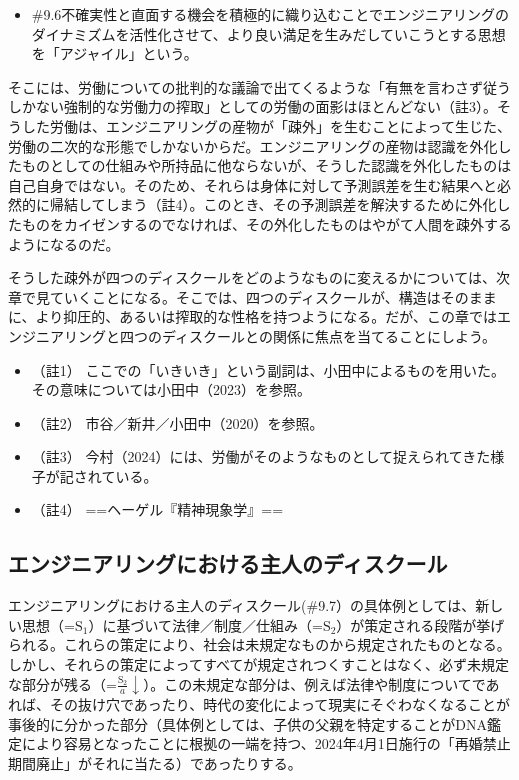 \begin{note}{}
  \begin{itemize}
    \tightlist
    \item{\#9.6}不確実性と直面する機会を積極的に織り込むことでエンジニアリングのダイナミズムを活性化させて、より良い満足を生みだしていこうとする思想を「アジャイル」という。
  \end{itemize}
\end{note}

そこには、労働についての批判的な議論で出てくるような「有無を言わさず従うしかない強制的な労働力の搾取」としての労働の面影はほとんどない（註3）。そうした労働は、エンジニアリングの産物が「疎外」を生むことによって生じた、労働の二次的な形態でしかないからだ。エンジニアリングの産物は認識を外化したものとしての仕組みや所持品に他ならないが、そうした認識を外化したものは自己自身ではない。そのため、それらは身体に対して予測誤差を生む結果へと必然的に帰結してしまう（註4）。このとき、その予測誤差を解決するために外化したものをカイゼンするのでなければ、その外化したものはやがて人間を疎外するようになるのだ。

そうした疎外が四つのディスクールをどのようなものに変えるかについては、次章で見ていくことになる。そこでは、四つのディスクールが、構造はそのままに、より抑圧的、あるいは搾取的な性格を持つようになる。だが、この章ではエンジニアリングと四つのディスクールとの関係に焦点を当てることにしよう。

\begin{itemize}
\tightlist
\item
  （註1）
  ここでの「いきいき」という副詞は、小田中によるものを用いた。その意味については小田中（2023）\cite{Odanaka}を参照。
\item
  （註2） 市谷／新井／小田中（2020）\cite{IchitaniEtAl}を参照。
\item
  （註3）
  今村（2024）\cite{Imamura}には、労働がそのようなものとして捉えられてきた様子が記されている。
\item
  （註4） ==ヘーゲル『精神現象学』==
\end{itemize}

\subsection{エンジニアリングにおける主人のディスクール}\label{ux30a8ux30f3ux30b8ux30cbux30a2ux30eaux30f3ux30b0ux306bux304aux3051ux308bux4e3bux4ebaux306eux30c7ux30a3ux30b9ux30afux30fcux30eb}

エンジニアリングにおける主人のディスクール(\#9.7）の具体例としては、新しい思想（=\(\textrm{S}_1\)）に基づいて法律／制度／仕組み（=\(\textrm{S}_2\)）が策定される段階が挙げられる。これらの策定により、社会は未規定なものから規定されたものとなる。しかし、それらの策定によってすべてが規定されつくすことはなく、必ず未規定な部分が残る（=\(\frac{\textrm{S}_2}{a}\downarrow\)）。この未規定な部分は、例えば法律や制度についてであれば、その抜け穴であったり、時代の変化によって現実にそぐわなくなることが事後的に分かった部分（具体例としては、子供の父親を特定することがDNA鑑定により容易となったことに根拠の一端を持つ、2024年4月1日施行の「再婚禁止期間廃止」がそれに当たる）であったりする。

